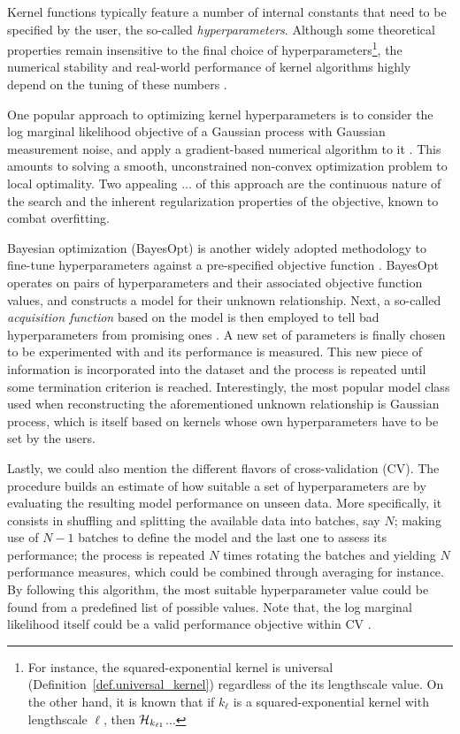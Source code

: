 Kernel functions typically feature a number of internal constants that need to be specified by the user, the so-called \textit{hyperparameters}. Although some theoretical properties remain insensitive to the final choice of hyperparameters\footnote{For instance, the squared-exponential kernel is universal (Definition~\ref{def.universal_kernel}) regardless of the its lengthscale value. On the other hand, it is known that if $k_\ell$ is a squared-exponential kernel with lengthscale $\ell$, then $\mathcal{H}_{k_{\ell1}}$... }, the numerical stability and real-world performance of kernel algorithms highly depend on the tuning of these numbers \citep{fasshauer2011positive}. 

One popular approach to optimizing kernel hyperparameters is to consider the log marginal likelihood objective of a Gaussian process with Gaussian measurement noise, and apply a gradient-based numerical algorithm to it \citep[§5.4.1]{williams2006gaussian}. This amounts to solving a smooth, unconstrained non-convex optimization problem to local optimality.  Two appealing ... of this approach are the continuous nature of the search and the inherent regularization properties of the objective, known to combat overfitting. 

Bayesian optimization (BayesOpt) is another widely adopted methodology to fine-tune hyperparameters against a pre-specified objective function \citep{snoek2012practical,shahriari2015taking}. BayesOpt operates on pairs of hyperparameters and their associated objective function values, and constructs a model for their unknown relationship. Next, a so-called \textit{acquisition function} based on the model is then employed to tell bad hyperparameters from promising ones \citep{wilson2018maximizing}. A new set of parameters is finally chosen to be experimented with and its performance is measured. This new piece of information is incorporated into the dataset and the process is repeated until some termination criterion is reached. Interestingly, the most popular model class used when reconstructing the aforementioned unknown relationship is Gaussian process, which is itself based on kernels whose own hyperparameters have to be set by the users.

Lastly, we could also mention the different flavors of cross-validation (CV). The procedure builds an estimate of how suitable a set of hyperparameters are by evaluating the resulting model performance on unseen data. More specifically, it consists in shuffling and splitting the available data into batches, say $N$; making use of $N-1$ batches to define the model and the last one to assess its performance; the process is repeated $N$ times rotating the batches and yielding $N$ performance measures, which could be combined through averaging for instance. By following this algorithm, the most suitable hyperparameter value could be found from a predefined list of possible values. Note that, the log marginal likelihood itself could be a valid performance objective within CV \citep[§5.4.2]{williams2006gaussian}.

